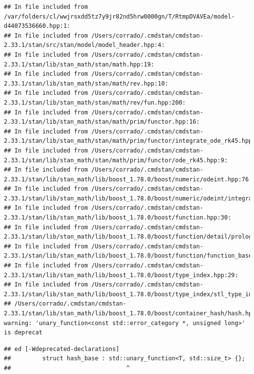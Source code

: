 \documentclass[
]{article}
\begin{document}
\begin{verbatim}
## In file included from /var/folders/cl/wwjrsxdd5tz7y9jr82nd5hrw0000gn/T/RtmpDVAVEa/model-d44073536660.hpp:1:
## In file included from /Users/corrado/.cmdstan/cmdstan-2.33.1/stan/src/stan/model/model_header.hpp:4:
## In file included from /Users/corrado/.cmdstan/cmdstan-2.33.1/stan/lib/stan_math/stan/math.hpp:19:
## In file included from /Users/corrado/.cmdstan/cmdstan-2.33.1/stan/lib/stan_math/stan/math/rev.hpp:10:
## In file included from /Users/corrado/.cmdstan/cmdstan-2.33.1/stan/lib/stan_math/stan/math/rev/fun.hpp:200:
## In file included from /Users/corrado/.cmdstan/cmdstan-2.33.1/stan/lib/stan_math/stan/math/prim/functor.hpp:16:
## In file included from /Users/corrado/.cmdstan/cmdstan-2.33.1/stan/lib/stan_math/stan/math/prim/functor/integrate_ode_rk45.hpp:6:
## In file included from /Users/corrado/.cmdstan/cmdstan-2.33.1/stan/lib/stan_math/stan/math/prim/functor/ode_rk45.hpp:9:
## In file included from /Users/corrado/.cmdstan/cmdstan-2.33.1/stan/lib/stan_math/lib/boost_1.78.0/boost/numeric/odeint.hpp:76:
## In file included from /Users/corrado/.cmdstan/cmdstan-2.33.1/stan/lib/stan_math/lib/boost_1.78.0/boost/numeric/odeint/integrate/observer_collection.hpp:23:
## In file included from /Users/corrado/.cmdstan/cmdstan-2.33.1/stan/lib/stan_math/lib/boost_1.78.0/boost/function.hpp:30:
## In file included from /Users/corrado/.cmdstan/cmdstan-2.33.1/stan/lib/stan_math/lib/boost_1.78.0/boost/function/detail/prologue.hpp:17:
## In file included from /Users/corrado/.cmdstan/cmdstan-2.33.1/stan/lib/stan_math/lib/boost_1.78.0/boost/function/function_base.hpp:21:
## In file included from /Users/corrado/.cmdstan/cmdstan-2.33.1/stan/lib/stan_math/lib/boost_1.78.0/boost/type_index.hpp:29:
## In file included from /Users/corrado/.cmdstan/cmdstan-2.33.1/stan/lib/stan_math/lib/boost_1.78.0/boost/type_index/stl_type_index.hpp:47:
## /Users/corrado/.cmdstan/cmdstan-2.33.1/stan/lib/stan_math/lib/boost_1.78.0/boost/container_hash/hash.hpp:132:33: warning: 'unary_function<const std::error_category *, unsigned long>' is deprecat
\end{verbatim}

\begin{verbatim}
## ed [-Wdeprecated-declarations]
##         struct hash_base : std::unary_function<T, std::size_t> {};
##                                 ^
\end{verbatim}
\end{document}
